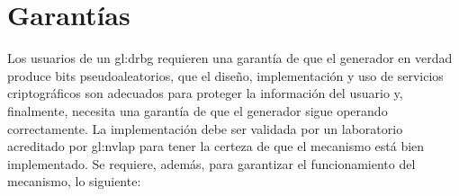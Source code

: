 %
%
\section{Garantías}

Los usuarios de un \gls{gl:drbg} requieren una garantía de que el generador
en verdad produce bits pseudoaleatorios, que el diseño, implementación y uso
de servicios criptográficos son adecuados para proteger la información del
usuario y, finalmente, necesita una garantía de que el generador sigue
operando correctamente. La implementación debe ser validada por un laboratorio
acreditado por \gls{gl:nvlap} para tener la certeza de que el mecanismo está
bien implementado. Se requiere, además, para garantizar el funcionamiento del
mecanismo, lo siguiente:
